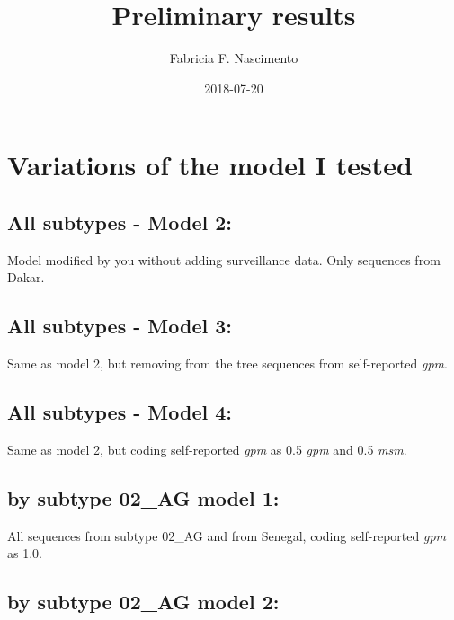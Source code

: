 \documentclass[12pt,]{article}
\title{Preliminary results}
\author{Fabricia F. Nascimento}
\date{2018-07-20}
\begin{document}
\maketitle

\hypertarget{variations-of-the-model-i-tested}{%
\section{Variations of the model I
tested}\label{variations-of-the-model-i-tested}}

\hypertarget{all-subtypes---model-2}{%
\subsection{All subtypes - Model 2:}\label{all-subtypes---model-2}}

Model modified by you without adding surveillance data. Only sequences
from Dakar.

\hypertarget{all-subtypes---model-3}{%
\subsection{All subtypes - Model 3:}\label{all-subtypes---model-3}}

Same as model 2, but removing from the tree sequences from self-reported
\emph{gpm}.

\hypertarget{all-subtypes---model-4}{%
\subsection{All subtypes - Model 4:}\label{all-subtypes---model-4}}

Same as model 2, but coding self-reported \emph{gpm} as 0.5 \emph{gpm}
and 0.5 \emph{msm}.

\hypertarget{by-subtype-02_ag-model-1}{%
\subsection{by subtype 02\_AG model 1:}\label{by-subtype-02_ag-model-1}}

All sequences from subtype 02\_AG and from Senegal, coding self-reported
\emph{gpm} as 1.0.

\hypertarget{by-subtype-02_ag-model-2}{%
\subsection{by subtype 02\_AG model 2:}\label{by-subtype-02_ag-model-2}}
\end{document}
